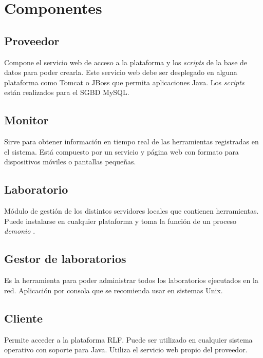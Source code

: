 

\section*{Componentes}
\subsection*{Proveedor }
Compone el servicio web de acceso a la plataforma y los \emph{scripts} de la 
base de datos para poder crearla. Este servicio web debe ser 
desplegado en alguna plataforma como Tomcat o JBoss que permita 
aplicaciones Java. Los \emph{scripts} están realizados para el SGBD MySQL.

\subsection*{Monitor }
Sirve para obtener información en tiempo real de las herramientas 
registradas en el sistema. Está compuesto por un servicio y página 
web con formato para dispositivos móviles o pantallas pequeñas.

\subsection*{Laboratorio }
Módulo de gestión de los distintos servidores locales que contienen 
herramientas. Puede instalarse en cualquier plataforma y toma la 
función de un proceso \emph{demonio} .

\subsection*{Gestor de laboratorios}
Es la herramienta para poder administrar todos los laboratorios 
ejecutados en la red. Aplicación por consola que se recomienda usar en 
sistemas Unix.

\subsection*{Cliente }
Permite acceder a la plataforma RLF. Puede ser utilizado en cualquier 
sistema operativo con soporte para Java. Utiliza el servicio web 
propio del proveedor.

